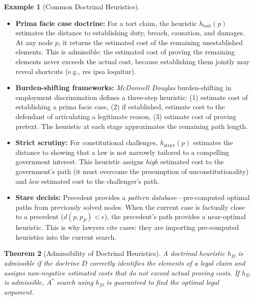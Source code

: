 \documentclass[12pt]{article}
\newtheorem{theorem}{Theorem}[section]
\theoremstyle{definition}
\newtheorem{example}[theorem]{Example}
\theoremstyle{remark}
\begin{document}
\begin{example}[Common Doctrinal Heuristics]
\label{ex:heuristics}
\begin{itemize}
    \item \textbf{Prima facie case doctrine:} For a tort claim, the heuristic $h_{\text{tort}}(p)$ estimates the distance to establishing duty, breach, causation, and damages.  At any node $p$, it returns the estimated cost of the remaining unestablished elements.  This is admissible: the estimated cost of proving the remaining elements never exceeds the actual cost, because establishing them jointly may reveal shortcuts (e.g., res ipsa loquitur).

    \item \textbf{Burden-shifting frameworks:} \emph{McDonnell Douglas} burden-shifting in employment discrimination defines a three-step heuristic: (1) estimate cost of establishing a prima facie case, (2) if established, estimate cost to the defendant of articulating a legitimate reason, (3) estimate cost of proving pretext.  The heuristic at each stage approximates the remaining path length.

    \item \textbf{Strict scrutiny:} For constitutional challenges, $h_{\text{strict}}(p)$ estimates the distance to showing that a law is not narrowly tailored to a compelling government interest.  This heuristic assigns \emph{high} estimated cost to the government's path (it must overcome the presumption of unconstitutionality) and \emph{low} estimated cost to the challenger's path.

    \item \textbf{Stare decisis:} Precedent provides a \emph{pattern database}---pre-computed optimal paths from previously solved nodes.  When the current case is factually close to a precedent ($d(p, p_P) < \epsilon$), the precedent's path provides a near-optimal heuristic.  This is why lawyers cite cases: they are importing pre-computed heuristics into the current search.
\end{itemize}
\end{example}

\begin{theorem}[Admissibility of Doctrinal Heuristics]
\label{thm:admissible}
A doctrinal heuristic $h_D$ is admissible if the doctrine $D$ correctly identifies the elements of a legal claim and assigns non-negative estimated costs that do not exceed actual proving costs.  If $h_D$ is admissible, $A^*$ search using $h_D$ is guaranteed to find the optimal legal argument.
\end{theorem}
\end{document}

